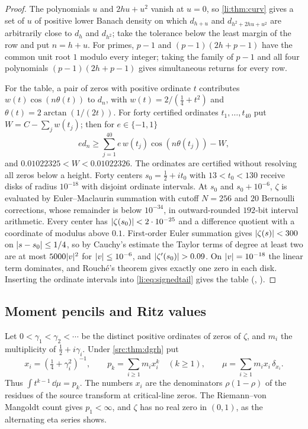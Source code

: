 \begin{proof}
The polynomials $u$ and $2hu+u^2$ vanish at $u=0$, so \cref{li:thm:curv} gives a set of $u$ of
positive lower Banach density on which $d_{h+u}$ and $d_{h^2+2hu+u^2}$ are arbitrarily close to
$d_h$ and $d_{h^2}$; take the tolerance below the least margin of the row and put $n=h+u$. For
primes, $p-1$ and $(p-1)(2h+p-1)$ have the common unit root $1$ modulo every integer; taking the
family of $p-1$ and all four polynomials $(p-1)(2h+p-1)$ gives simultaneous returns for every row.

For the table, a pair of zeros with positive ordinate $t$ contributes $w(t)\cos(n\theta(t))$ to
$d_n$, with $w(t)=2/(\frac14+t^2)$ and $\theta(t)=2\arctan(1/(2t))$. For forty certified ordinates
$t_1,\dots,t_{40}$ put $W=C-\sum_jw(t_j)$; then for $e\in\{-1,1\}$
\begin{equation}\label{li:eq:signedtail}
 ed_n\ge\sum_{j=1}^{40}e\,w(t_j)\cos(n\theta(t_j))-W ,
\end{equation}
and $0.01022325<W<0.01022326$. The ordinates are certified without resolving all zeros below a
height. Forty centers $s_0=\frac12+it_0$ with $13<t_0<130$ receive disks of radius $10^{-18}$ with
disjoint ordinate intervals. At $s_0$ and $s_0+10^{-6}$, $\zeta$ is evaluated by Euler--Maclaurin
summation with cutoff $N=256$ and $20$ Bernoulli corrections, whose remainder is below $10^{-34}$,
in outward-rounded $192$-bit interval arithmetic. Every center has $\lvert\zeta(s_0)\rvert<2\cdot10^{-25}$
and a difference quotient with a coordinate of modulus above $0.1$. First-order Euler summation
gives $\lvert\zeta(s)\rvert<300$ on $\lvert s-s_0\rvert\le1/4$, so by Cauchy's estimate the Taylor terms of
degree at least two are at most $5000\lvert v\rvert^2$ for $\lvert v\rvert\le10^{-6}$, and
$\lvert\zeta'(s_0)\rvert>0.09$. On $\lvert v\rvert=10^{-18}$ the linear term dominates, and Rouch\'e's theorem
gives exactly one zero in each disk. Inserting the ordinate intervals into
\eqref{li:eq:signedtail} gives the table
(,
).
\end{proof}

\subsection{Moment pencils and Ritz values}\label{li:sec:ritz}

Let $0<\gamma_1<\gamma_2<\cdots$ be the distinct positive ordinates of zeros of $\zeta$, and $m_i$
the multiplicity of $\frac12+i\gamma_i$. Under \cref{src:thm:dgrh} put
\begin{equation}\label{li:eq:mu}
 x_i=(\tfrac14+\gamma_i^2)^{-1},\qquad p_k=\sum_{i\ge1}m_ix_i^k\quad(k\ge1),\qquad
 \mu=\sum_{i\ge1}m_ix_i\,\delta_{x_i}.
\end{equation}
Thus $\int t^{k-1}\,\dd\mu=p_k$. The numbers $x_i$ are the denominators $\rho(1-\rho)$ of the
residues of the source transform at critical-line zeros. The Riemann--von Mangoldt count gives
$p_1<\infty$, and $\zeta$ has no real zero in $(0,1)$, as the alternating eta series shows.

